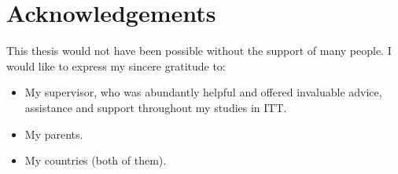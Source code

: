 
\chapter*{Acknowledgements}

This thesis would not have been possible without the support of many people. I would like to express my
sincere gratitude to:

\begin{itemize}
\item  My supervisor, who was abundantly helpful and offered invaluable advice,
assistance and support throughout my studies in ITT.
\item  My parents.
\item  My countries (both of them).  
\end{itemize}


